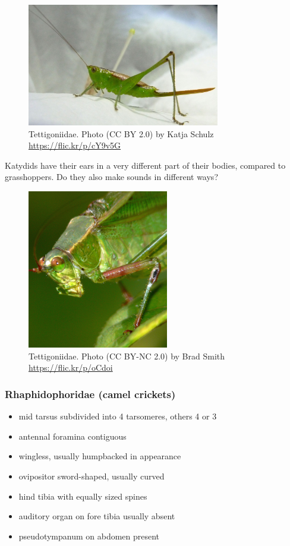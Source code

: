 \documentclass[letterpaper, 11pt]{article}
\begin{document}
\begin{figure}[ht!]
  \centering
    \includegraphics[width=0.75\textwidth]{tetti1}
  \caption{Tettigoniidae. Photo (CC BY 2.0) by Katja Schulz \url{https://flic.kr/p/cY9v5G}}
  \label{fig:tettihabitus}
\end{figure}

\noindent{}Katydids have their ears in a very different part of their bodies, compared to grasshoppers. Do they also make sounds in different ways? \vspace{3cm}

\begin{figure}[ht!]
  \centering
    \includegraphics[width=0.55\textwidth]{tetti2}
  \caption{Tettigoniidae. Photo (CC BY-NC 2.0) by Brad Smith \url{https://flic.kr/p/oCdoi}}
  \label{fig:tettihead}
\end{figure}

\subsubsection*{Rhaphidophoridae (camel crickets)}
\begin{itemize}
\item mid tarsus subdivided into 4 tarsomeres, others 4 or 3
\item antennal foramina contiguous
\item wingless, usually humpbacked in appearance
\item ovipositor sword-shaped, usually curved
\item hind tibia with equally sized spines
\item auditory organ on fore tibia usually absent
\item pseudotympanum on abdomen present
\end{itemize}
\end{document}
